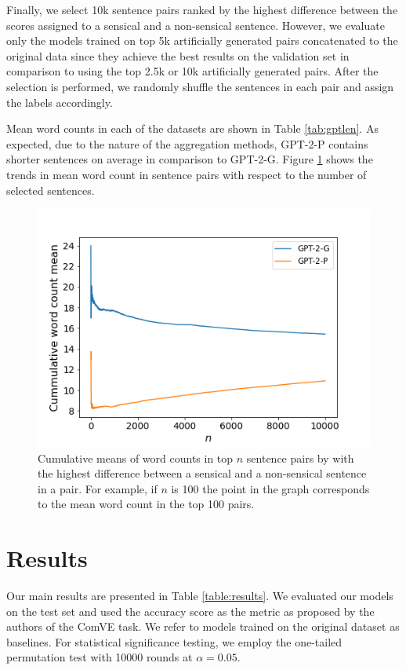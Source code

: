 \documentclass[10pt, a4paper]{article}
\begin{document}
Finally, we select 10k sentence pairs ranked by the highest difference between the scores assigned to a sensical and a non-sensical sentence. However, we evaluate only the models trained on top 5k artificially generated pairs concatenated to the original data since they achieve the best results on the validation set in comparison to using the top 2.5k or 10k artificially generated pairs. After the selection is performed, we randomly shuffle the sentences in each pair and assign the labels accordingly. 

Mean word counts in each of the datasets are shown in Table \ref{tab:gptlen}. As expected, due to the nature of the aggregation methods, GPT-2-P contains shorter sentences on average in comparison to GPT-2-G. Figure \ref{fig:cum} shows the trends in mean word count in sentence pairs with respect to the number of selected sentences.

\begin{figure}
    \centering
    \includegraphics[width=\columnwidth]{images/cummean (2).png}
    \caption{Cumulative means of word counts in top $n$ sentence pairs by with the highest difference between a sensical and a non-sensical sentence in a pair. For example, if $n$ is 100 the point in the graph corresponds to the mean word count in the top 100 pairs.}
    \label{fig:cum}
\end{figure}

\section{Results}
\label{results}
Our main results are presented in Table \ref{table:results}. We evaluated our models on the test set and used the accuracy score as the metric as proposed by the authors of the ComVE task. We refer to models trained on the original dataset as baselines. For statistical significance testing, we employ the one-tailed permutation test with 10000 rounds at $\alpha = 0.05$.
\end{document}
